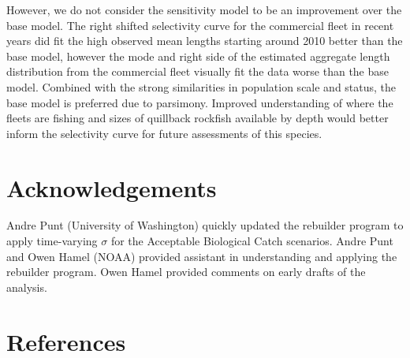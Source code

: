 \documentclass[11pt,
  english,
  a4paper,
]{article}
\begin{document}
\leavevmode\tagmcend\tagstructend\par


However, we do not consider the sensitivity model to be an improvement over the base model. The right shifted selectivity curve for the commercial fleet in recent years did fit the high observed mean lengths starting around 2010 better than the base model, however the mode and right side of the estimated aggregate length distribution from the commercial fleet visually fit the data worse than the base model. Combined with the strong similarities in population scale and status, the base model is preferred due to parsimony. Improved understanding of where the fleets are fishing and sizes of quillback rockfish available by depth would better inform the selectivity curve for future assessments of this species.

\leavevmode\tagmcend\tagstructend\par


\hypertarget{acknowledgements}{%
\section{Acknowledgements}\label{acknowledgements}}

\leavevmode\tagmcend\tagstructend


Andre Punt (University of Washington) quickly updated the rebuilder program to apply time-varying {\(\sigma\)\leavevmode\tagmcend\tagstructend} for the Acceptable Biological Catch scenarios. Andre Punt and Owen Hamel (NOAA) provided assistant in understanding and applying the rebuilder program. Owen Hamel provided comments on early drafts of the analysis.

\leavevmode\tagmcend\tagstructend\par

\clearpage


\hypertarget{references}{%
\section{References}\label{references}}

\leavevmode\tagmcend\tagstructend
\end{document}
